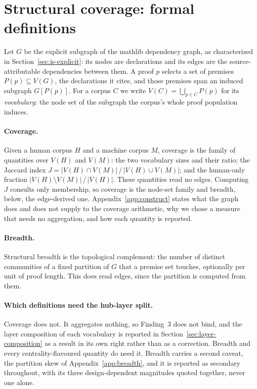 
\section{Structural coverage: formal definitions}
\label{sec:definitions}

Let $G$ be the explicit subgraph of the mathlib dependency graph, as
characterized in Section~\ref{sec:is-explicit}: its nodes are declarations and
its edges are the source-attributable dependencies between them. A proof $p$
selects a set of premises $P(p) \subseteq V(G)$, the declarations it cites, and
those premises span an induced subgraph $G[P(p)]$. For a corpus $C$ we write
$V(C) = \bigcup_{p \in C} P(p)$ for its \emph{vocabulary}: the node set of the
subgraph the corpus's whole proof population induces.

\paragraph{Coverage.} Given a human corpus $H$ and a machine corpus $M$,
coverage is the family of quantities over $V(H)$ and $V(M)$: the two
vocabulary sizes and their ratio; the Jaccard index
$J = |V(H) \cap V(M)| \,/\, |V(H) \cup V(M)|$; and the human-only fraction
$|V(H) \setminus V(M)| \,/\, |V(H)|$. These quantities read no edges.
Computing $J$ consults only membership, so coverage is the node-set family and
breadth, below, the edge-derived one. Appendix~\ref{app:construct} states what
the graph does and does not supply to the coverage arithmetic, why we chose a
measure that needs no aggregation, and how each quantity is reported.

\paragraph{Breadth.} Structural breadth is the topological complement: the
number of distinct communities of a fixed partition of $G$ that a premise set
touches, optionally per unit of proof length. This does read edges, since the
partition is computed from them.

\paragraph{Which definitions need the hub-layer split.} Coverage does not. It
aggregates nothing, so Finding~3 does not bind, and the layer composition of
each vocabulary is reported in Section~\ref{sec:layer-composition} as a result
in its own right rather than as a correction. Breadth and every
centrality-flavoured quantity do need it. Breadth carries a second caveat, the
partition skew of Appendix~\ref{app:breadth}, and it is reported as secondary
throughout, with its three design-dependent magnitudes quoted together, never
one alone.
